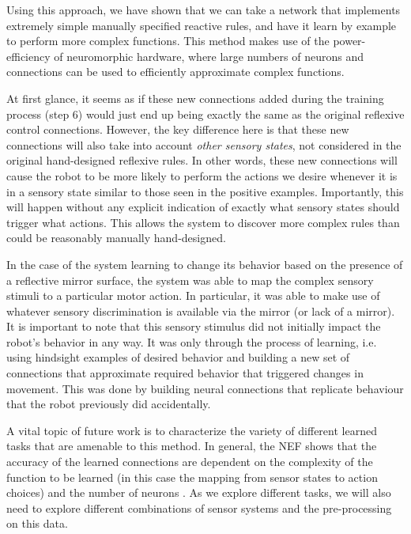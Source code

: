 \documentclass[conference]{IEEEtran}
\begin{document}
Using this approach, we have shown that we can take a network that
implements extremely simple manually specified reactive rules, and have
it learn by example to perform more complex functions.  This method
makes use of the power-efficiency of neuromorphic hardware, where large
numbers of neurons and connections can be used to efficiently
approximate complex functions.

At first glance, it seems as if these new connections added during the
training process (step 6) would just end up being 
exactly the same as the original reflexive control connections. However, the 
key difference here is that these new connections will also take into 
account \textit{other sensory states}, not considered in the original 
hand-designed reflexive rules. In other words, these new connections will 
cause the robot to be more likely to perform the actions we desire whenever it is in a sensory state similar to those seen in the positive examples. 
Importantly, this will happen without any explicit indication of exactly what 
sensory states should trigger what actions.  This allows the system to
discover more complex rules than could be reasonably manually hand-designed.

In the case of the system learning to change its behavior based on the 
presence of a reflective mirror surface, the system was able to map the 
complex sensory stimuli to a particular motor action.  In particular, it
was able to make use of whatever sensory discrimination is available via
the mirror (or lack of a mirror).  It is important to note that this sensory 
stimulus did not initially impact the robot's behavior in any way. It was 
only through the process of learning, i.e. using hindsight examples of desired 
behavior and building a new set of connections that approximate required 
behavior that triggered changes in movement.  This was done by building neural
connections that replicate behaviour that the robot previously did accidentally.

A vital topic of future work is to characterize the variety of different
learned tasks that are amenable to this method.  In general, the NEF shows
that the accuracy of the learned connections are dependent on the complexity
of the function to be learned (in this case the mapping from sensor states to
action choices) and the number of neurons \cite{eliasmith2004neural}.  As we explore different tasks,
we will also need to explore different combinations of sensor systems and
the pre-processing on this data.  
\end{document}
